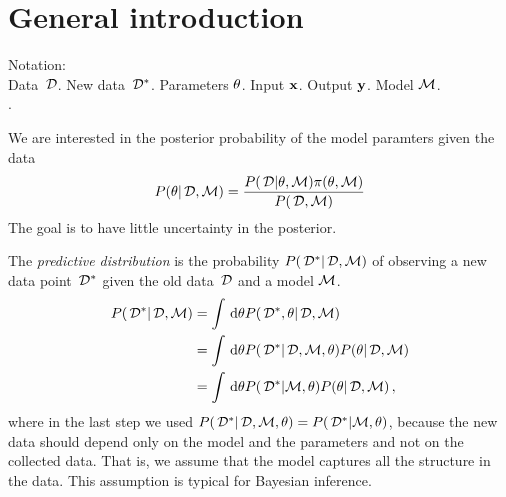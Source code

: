 
\section*{General introduction} %
\label{sec:general_introduction}
Notation: \\
Data $\,\mathcal{D}$. New data $\,\mathcal{D}^*$. Parameters $\theta$. Input ${\bf x}$. Output ${\bf y}$. Model $\mathcal{M}$. \\
.

We are interested in the posterior probability of the model paramters given the data
\begin{align}\label{eq:posterior}
	{P(\theta| \,\mathcal{D}, \mathcal{M})} = \frac{{P(\,\mathcal{D} | \theta, \mathcal{M})} {\pi(\theta, \mathcal{M})}}{{P(\,\mathcal{D}, \mathcal{M})}}
\end{align}
The goal is to have little uncertainty in the posterior. 

The \emph{predictive distribution} is the probability ${P(\,\mathcal{D}^* | \,\mathcal{D}, \mathcal{M})}$ of observing a new data point $\,\mathcal{D}^*$ given the old data $\,\mathcal{D}$ and a model $\mathcal{M}$.
\begin{align*}
	{P(\,\mathcal{D}^* | \,\mathcal{D}, \mathcal{M})}
	&= \int \,\mathrm{d} \theta
		{P(\,\mathcal{D}^*, \theta| \,\mathcal{D}, \mathcal{M})} \\
	&= \int \,\mathrm{d} \theta
		{P(\,\mathcal{D}^* | \,\mathcal{D}, \mathcal{M}, \theta)}
		{P(\theta| \,\mathcal{D}, \mathcal{M})} \\
	&= \int \,\mathrm{d} \theta
		{P(\,\mathcal{D}^* | \mathcal{M}, \theta)}
		{P(\theta| \,\mathcal{D}, \mathcal{M})} \,,
\end{align*}
where in the last step we used ${P(\,\mathcal{D}^* | \,\mathcal{D}, \mathcal{M}, \theta)} = {P(\,\mathcal{D}^* | \mathcal{M}, \theta)}$, because the new data should depend only on the model and the parameters and not on the collected data. That is, we assume that the model captures all the structure in the data. This assumption is typical for Bayesian inference.

